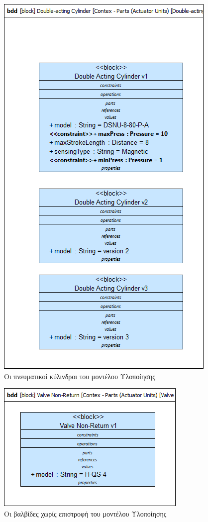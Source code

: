 \documentclass[a4paper,12pt,twoside]{report}
\begin{document}
\begin{appendices}
				\begin{figure}[hp]
					\centering
					\includegraphics[scale=0.50]{DesignModel_Contex-Parts(ActuatorUnits)[Double-actingCylinder].png}
					\caption{Οι πνευματικοί κύλινδροι του μοντέλου Υλοποίησης}
					\label{φωτ:Οι πνευματικοί κύλινδροι του μοντέλου Υλοποίησης}
				\end{figure}
				
				\begin{figure}[hp]
					\centering
					\includegraphics[scale=0.50]{DesignModel_Contex-Parts(ActuatorUnits)[ValveNon-Return].png}
					\caption{Οι βαλβίδες χωρίς επιστροφή του μοντέλου Υλοποίησης}
					\label{φωτ:Οι βαλβίδες χωρίς επιστροφή του μοντέλου Υλοποίησης}
				\end{figure}
				

\end{appendices}
\end{document}
